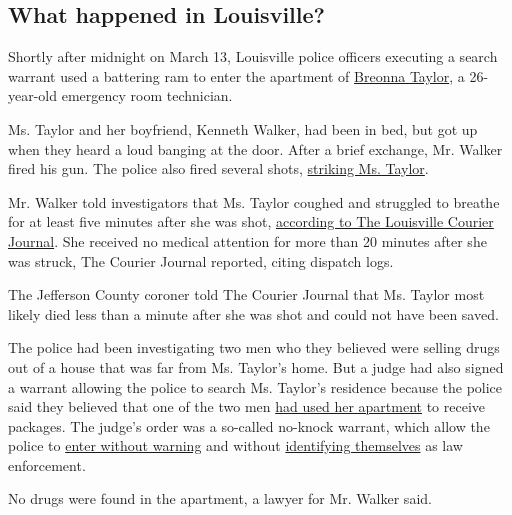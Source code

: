 \hypertarget{what-happened-in-louisville}{%
\subsection{What happened in
Louisville?}\label{what-happened-in-louisville}}

Shortly after midnight on March 13, Louisville police officers executing
a search warrant used a battering ram to enter the apartment of
\href{https://www.nytimes.com/2020/06/12/us/breonna-taylor-law-passed.html}{Breonna
Taylor}, a 26-year-old emergency room technician.

Ms. Taylor and her boyfriend, Kenneth Walker, had been in bed, but got
up when they heard a loud banging at the door. After a brief exchange,
Mr. Walker fired his gun. The police also fired several shots,
\href{https://www.nytimes.com/2020/05/14/us/breonna-taylor-louisville-shooting.html}{striking
Ms. Taylor}.

Mr. Walker told investigators that Ms. Taylor coughed and struggled to
breathe for at least five minutes after she was shot,
\href{https://www.courier-journal.com/story/news/crime/2020/07/17/breonna-taylor-lay-untouched-20-minutes-after-being-shot-records/5389881002/}{according
to The Louisville Courier Journal}. She received no medical attention
for more than 20 minutes after she was struck, The Courier Journal
reported, citing dispatch logs.

The Jefferson County coroner told The Courier Journal that Ms. Taylor
most likely died less than a minute after she was shot and could not
have been saved.

The police had been investigating two men who they believed were selling
drugs out of a house that was far from Ms. Taylor's home. But a judge
had also signed a warrant allowing the police to search Ms. Taylor's
residence because the police said they believed that one of the two men
\href{https://www.courier-journal.com/story/news/2020/05/12/breonna-taylor-louisville-emt-not-main-target-drug-investigation/3115928001/}{had
used her apartment} to receive packages. The judge's order was a
so-called no-knock warrant, which allow the police to
\href{https://www.nytimes.com/interactive/2017/03/18/us/forced-entry-warrant-drug-raid.html}{enter
without warning} and without
\href{https://www.courier-journal.com/story/news/2020/05/12/breonna-taylor-louisville-emt-not-main-target-drug-investigation/3115928001/}{identifying
themselves} as law enforcement.

No drugs were found in the apartment, a lawyer for Mr. Walker said.

